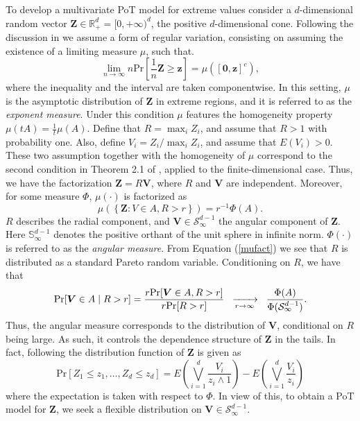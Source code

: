 To develop a multivariate PoT model for extreme values consider a $d$-dimensional random vector $\bm{Z} \in {\mathbb R}^d_+ = [0,+\infty)^d$, the positive $d$-dimensional cone. Following the discussion in \cite{goix2017} we assume a form of regular variation, consisting on assuming the existence of a limiting measure $\mu$, such that.
\[
    \lim\limits_{n\to\infty}n\text{Pr}\left[\frac{1}{n}\bm{Z}\geq \bm{z}\right] = \mu\left([\bm{0},\bm{z}]^c\right),
\]
where the inequality and the interval are taken componentwise. 
In this setting, $\mu$ is the asymptotic distribution of $\bm{Z}$ in extreme regions, and it is referred to as the
  \emph{exponent measure}. Under this condition $\mu$ features the homogeneity property $\mu(tA) = \frac{1}{t}\mu(A)$. 
Define that $R = \max_{i} Z_i$, and assume that $R>1$ with probability one. Also, define $V_i = Z_i/\max_i Z_i$, and assume that $E(V_i)>0$.
These two assumption together with the homogeneity of $\mu$ correspond to the second condition in Theorem 2.1 of
\cite{ferreira2014}, applied to the finite-dimensional case.
Thus, we have the factorization $\bm{Z} =  R\bm{V}$, where $R$ and $\bm{V}$  are independent. Moreover,
for some measure $\Phi$, $\mu(\cdot)$ is factorized as
\begin{equation}\label{mufact}
    \mu\left( \left\lbrace\bm{Z} : V \in A , R > r\right\rbrace \right) = r^{-1}\Phi(A).
\end{equation}
$R$ describes the radial component, and $\bm{V} \in \mathcal{S}_{\infty}^{d-1}$ the 
angular component of $\bm{Z}$.  Here ${\mathbb S}_\infty^{d-1}$ denotes the positive
orthant of the unit sphere in infinite norm.  $\Phi(\cdot)$ is referred to as the \emph{angular measure}.   
From Equation (\ref{mufact}) we see that $R$ is distributed as a standard Pareto random variable. Conditioning on $R$, we have that
\begin{equation} \label{MGP}
    \text{Pr}\left[\bm{V} \in A \mid R > r\right]
      = \frac{r\text{Pr}\left[\bm{V} \in A, R > r\right]}{r\text{Pr}[R > r]}\hspace{0.2cm}
      \xrightarrow[r\to\infty]{~} \hspace{0.2cm} \frac{\Phi(A)}{\Phi(\mathcal{S}_{\infty}^{d-1})}.
\end{equation}
 Thus, the angular measure corresponds to the distribution of $\bm{V}$, conditional on $R$ being large.
 As such, it controls the dependence structure of $\bm{Z}$ in the tails. In fact, following \cite{ferreira2014} the distribution function of $\bm{Z}$ is given as
\begin{equation*}
	\text{Pr}[Z_1\leq z_1, \ldots ,Z_d\leq z_d] = E\left(\bigvee_{i=1}^d
\frac{V_i}{z_i\wedge 1}\right) - E\left(\bigvee_{i=1}^d
\frac{V_i}{z_i}\right) 
\end{equation*}
where the expectation is taken with respect to $\Phi$.
In view of this, to obtain a PoT model for $\bm{Z}$, we seek 
a flexible distribution on $\bm{V} \in \mathcal{S}_{\infty}^{d-1}$.

